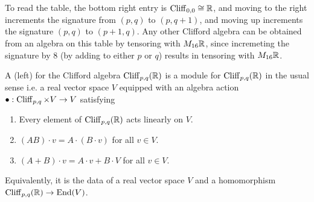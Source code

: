 $ $\\\\\\
To read the table, the bottom right entry is $\operatorname{Cliff}_{0,0} \cong \mathbb{R}$, and moving to
the right increments the signature from $(p,q)$ to $(p,q+1)$, and moving up
increments the signature $(p,q)$ to $(p+1,q)$. Any other Clifford algebra
can be obtained from an algebra on this table by tensoring with $M_{16}\mathbb{R}$, since
incremeting the signature by $8$ (by adding to either $p$ or $q$) results in
tensoring with $M_{16}\mathbb{R}$.
%
\begin{defn}
A (left)  for the Clifford algebra $\operatorname{Cliff}_{p,q}(\mathbb{R})$ is a module
for $\operatorname{Cliff}_{p,q}(\mathbb{R})$ in the usual sense i.e. a real vector space $V$ equipped
with an algebra action $\bullet: \operatorname{Cliff}_{p,q} \times V \to V$ satisfying
\begin{enumerate}
  \item Every element of $\operatorname{Cliff}_{p,q}(\mathbb{R})$ acts linearly on $V$.
  \item $(AB) \cdot v = A\cdot(B \cdot v)$ for all $v \in V$.
  \item $(A + B) \cdot v = A\cdot v + B\cdot V$ for all $v \in V$.
\end{enumerate}
Equivalently, it is the data of a real vector space $V$ and a homomorphism
$\operatorname{Cliff}_{p,q}(\mathbb{R}) \to \operatorname{End}(V)$.
\end{defn}
